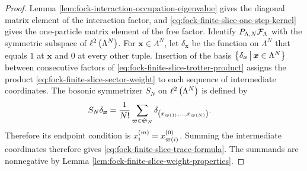 \documentclass[11pt,a4paper]{article}
\theoremstyle{plain}
\theoremstyle{definition}
\theoremstyle{remark}
\begin{document}
\begin{proof}
Lemma \ref{lem:fock-interaction-occupation-eigenvalue} gives the diagonal matrix element of the interaction
factor, and \eqref{eq:fock-finite-slice-one-step-kernel} gives the one-particle matrix element of the free
factor.  Identify $P_{\Lambda,N}\sphilb{F}_{\Lambda}$ with the symmetric subspace of
$\ell^2\left( \Lambda^N \right)$.  For $\boldsymbol{x}\in\Lambda^N$, let $\delta_{\boldsymbol{x}}$ be the function on
$\Lambda^N$ that equals $1$ at $\boldsymbol{x}$ and $0$ at every other tuple.  Insertion of the basis
$\left\{\delta_{\boldsymbol{x}} \, \middle| \, \boldsymbol{x}\in\Lambda^N\right\}$ between consecutive factors of
\eqref{eq:fock-finite-slice-trotter-product} assigns the product
\eqref{eq:fock-finite-slice-sector-weight} to each sequence of intermediate coordinates.
The bosonic symmetrizer $S_N$ on $\ell^2\left( \Lambda^N \right)$ is defined by
$$\begin{aligned}
S_N\delta_{\boldsymbol{x}}
& =
\frac{1}{N!}
\sum_{\varpi\in\grsym{N}}
\delta_{\rbk{x_{\fun{\varpi}{1}},\ldots,x_{\fun{\varpi}{N}}}}.
\end{aligned}$$
Therefore its endpoint condition is
$x_i^{(m)}=x_{\varpi \left( i \right)}^{(0)}$.  Summing the intermediate coordinates therefore gives
\eqref{eq:fock-finite-slice-trace-formula}.  The summands are nonnegative by
Lemma \ref{lem:fock-finite-slice-weight-properties}.
\end{proof}
\end{document}
